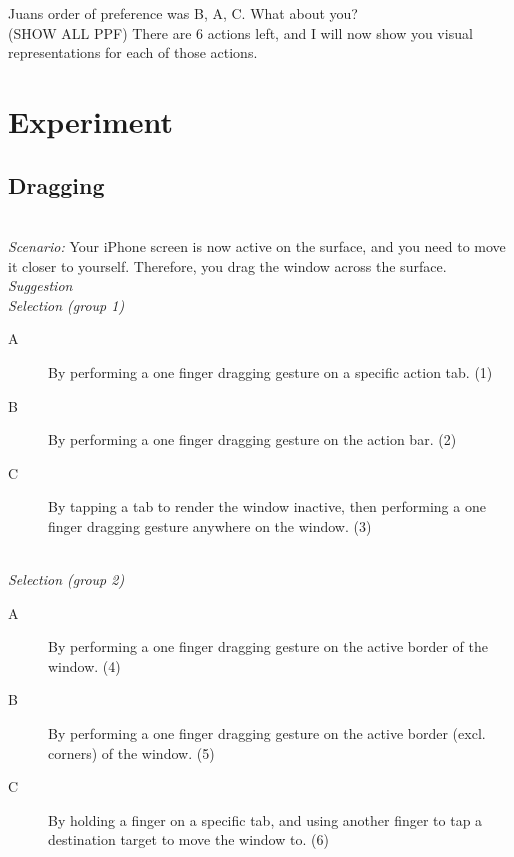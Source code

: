 Juans order of preference was B, A, C.
What about you?
\hfill\\
(SHOW ALL PPF)
There are 6 actions left, and I will now show you visual representations for each of those actions.

\section{Experiment}


\subsection{Dragging}
\hfill\\
\emph{Scenario:}
Your iPhone screen is now active on the surface, and you need to move it closer to yourself. Therefore, you drag the window across the surface.
\hfill\\
\emph{Suggestion}
\hfill\\
\emph{Selection (group 1)}
\begin{description}
\item[A]{By performing a one finger dragging gesture on a specific action tab. (1)}
\item[B]{By performing a one finger dragging gesture on the action bar. (2)}
\item[C]{By tapping a tab to render the window inactive, then performing a one finger dragging gesture anywhere on the window. (3)}
\end{description}
\hfill\\
\emph{Selection (group 2)}
\begin{description}
\item[A]{By performing a one finger dragging gesture on the active border of the window. (4)}
\item[B]{By performing a one finger dragging gesture on the active border (excl. corners) of the window. (5)}
\item[C]{By holding a finger on a specific tab, and using another finger to tap a destination target to move the window to. (6)}
\end{description}


